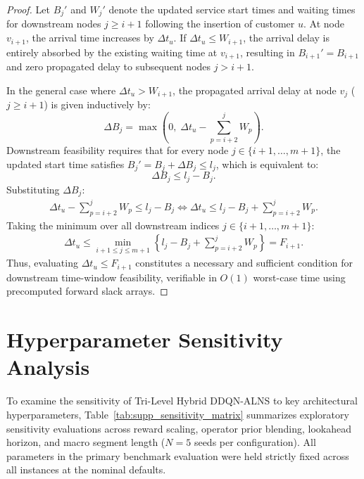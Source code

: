 \documentclass{article}
\begin{document}
\begin{proof}
Let $B_j'$ and $W_j'$ denote the updated service start times and waiting times for downstream nodes $j \ge i+1$ following the insertion of customer $u$.
At node $v_{i+1}$, the arrival time increases by $\Delta t_u$. If $\Delta t_u \le W_{i+1}$, the arrival delay is entirely absorbed by the existing waiting time at $v_{i+1}$, resulting in $B_{i+1}' = B_{i+1}$ and zero propagated delay to subsequent nodes $j > i+1$.

In the general case where $\Delta t_u > W_{i+1}$, the propagated arrival delay at node $v_j$ ($j \ge i+1$) is given inductively by:
\begin{equation}
\Delta B_j = \max\left(0, \; \Delta t_u - \sum_{p=i+2}^j W_p \right).
\end{equation}
Downstream feasibility requires that for every node $j \in \{i+1, \dots, m+1\}$, the updated start time satisfies $B_j' = B_j + \Delta B_j \le l_j$, which is equivalent to:
\begin{equation}
\Delta B_j \le l_j - B_j.
\end{equation}
Substituting $\Delta B_j$:
\begin{align}
\Delta t_u - \sum_{p=i+2}^j W_p \le l_j - B_j \iff \Delta t_u \le l_j - B_j + \sum_{p=i+2}^j W_p.
\end{align}
Taking the minimum over all downstream indices $j \in \{i+1, \dots, m+1\}$:
\begin{align}
\Delta t_u \le \min_{i+1 \le j \le m+1} \left\{ l_j - B_j + \sum_{p=i+2}^j W_p \right\} = F_{i+1}.
\end{align}
Thus, evaluating $\Delta t_u \le F_{i+1}$ constitutes a necessary and sufficient condition for downstream time-window feasibility, verifiable in $O(1)$ worst-case time using precomputed forward slack arrays.
\end{proof}

\section{Hyperparameter Sensitivity Analysis}
\label{sec:supp_sensitivity}

To examine the sensitivity of Tri-Level Hybrid DDQN-ALNS to key architectural hyperparameters, Table~\ref{tab:supp_sensitivity_matrix} summarizes exploratory sensitivity evaluations across reward scaling, operator prior blending, lookahead horizon, and macro segment length ($N=5$ seeds per configuration). All parameters in the primary benchmark evaluation were held strictly fixed across all instances at the nominal defaults.
\end{document}
